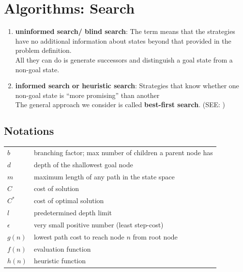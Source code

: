 \chapter{Algorithms: Search}

\begin{enumerate}
    \item \textbf{uninformed search/ blind search}: The term means that the strategies have no additional information about states beyond that provided in the problem definition.\\
    All they can do is generate successors and distinguish a goal state from a non-goal state. 

    \item \textbf{ informed search or heuristic search}: Strategies that know whether one non-goal state is “more promising” than another\\
    The general approach we consider is called \textbf{best-first search}. (SEE: )
\end{enumerate}

\section*{Notations}

\begin{customTableWrapper}{1.2}
\begin{longtable}{l p{8cm}}
    $b$ & branching factor; max number of children a parent node has\\

    $d$ & depth of the shallowest goal node\\

    $m$ & maximum length of any path in the state space\\

    $C$ & cost of solution\\

    $C^\ast$ & cost of optimal solution\\

    $l$ & predetermined depth limit \\

    $\epsilon$ & very small positive number (least step-cost)\\

    \hline

    $g(n)$ & lowest path cost to reach node $n$ from root node\\

    $f(n)$ & evaluation function \\

    $h(n)$ & heuristic function \\
\end{longtable}
\end{customTableWrapper}

